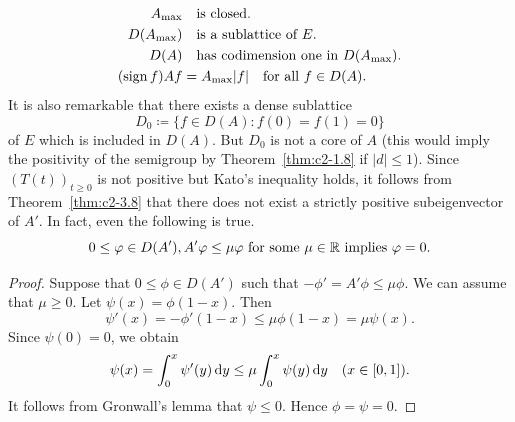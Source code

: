 \begin{align}\label{eq:c2-3.12}
A_{\max} 	& \quad \text{is closed}. \\
D(A_{\max}) & \quad \text{is a sublattice of } E. \\
D(A) & \quad \text{has codimension one in } D(A_{\max}). \\
(\operatorname{sign}  f)Af &= A_{\max}|f| \quad \text{for all } f \in D(A).
\end{align}
It is also remarkable that there exists a dense sublattice 
%
\[
	D_{0} \coloneq \{f \in D(A) \colon f(0) = f(1) = 0\} 
\]
%
of\/ $E$ which is included in $D(A)$.
But $D_{0}$ is not a core of\/ $A$ (this would imply the positivity of the semigroup by Theorem~\ref{thm:c2-1.8}   if\/ $|d| \leq 1$).
Since $(T(t))_{t \geq 0}$ is not positive but Kato's inequality holds, it
follows from Theorem~\ref{thm:c2-3.8}   that there does not exist a strictly positive subeigenvector of\/ $A'$. 
In fact, even the following is true.
\begin{equation} \label{eq:c2-3.16} 
0 \leq \phi \in D(A'),  A'\phi \leq \mu\phi \text{ for some } \mu \in \R \text{ implies } \phi = 0.
\end{equation}
\begin{proof}
Suppose that $0 \leq \phi \in D(A')$ such that $-\phi' = A'\phi \leq \mu\phi$. 
We can assume that $\mu \geq 0$. 
Let $\psi(x) = \phi(1-x)$. 
Then 
\[
\psi'(x) = -\phi'(1-x) \leq \mu\phi(1-x) = \mu\psi(x) .
\]
Since $\psi(0) = 0$, we obtain
\begin{equation*} 
\psi(x) = \int_{0}^{x} \psi'(y) \dy \leq \mu \int_{0}^{x} \psi(y) \dy \quad (x \in [0,1]).
\end{equation*}
It follows from Gronwall's lemma that $\psi \leq 0$. Hence $\phi = \psi = 0$.
\end{proof}
